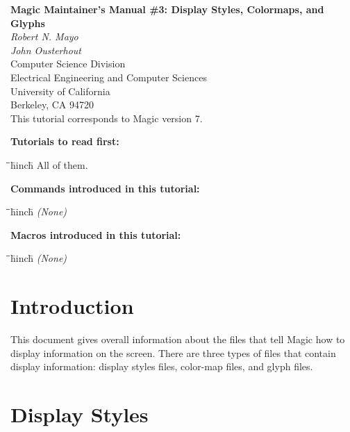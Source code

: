 \documentclass[letterpaper,twoside,12pt]{article}
\def\hinch{\hspace*{0.5in}}
\def\starti{\begin{center}\begin{tabbing}\hinch\=\hinch\=\hinch\=hinch\hinch\=\kill}
\def\endi{\end{tabbing}\end{center}}
\def\mytitle{Magic Maintainer's Manual \#3: Display Styles, Colormaps, and Glyphs}
\begin{document}
\makeatletter
\newcommand{\ps@magic}{%
	\renewcommand{\@oddhead}{\mytitle\hfil\today}%
	\renewcommand{\@evenhead}{\today\hfil\mytitle}%
	\renewcommand{\@evenfoot}{\hfil\textrm{--{\thepage}--}\hfil}%
	\renewcommand{\@oddfoot}{\@evenfoot}}
\newcommand{\ps@mplain}{%
	\renewcommand{\@oddhead}{}%
	\renewcommand{\@evenhead}{}%
	\renewcommand{\@evenfoot}{\hfil\textrm{--{\thepage}--}\hfil}%
	\renewcommand{\@oddfoot}{\@evenfoot}}
\makeatother
\pagestyle{magic}
\thispagestyle{mplain}


\begin{center}
  {\bfseries \Large \mytitle} \\
  \vspace*{0.5in}
  {\itshape Robert N. Mayo} \\
  {\itshape John Ousterhout} \\
  \vspace*{0.5in}
   Computer Science Division \\
   Electrical Engineering and Computer Sciences \\
   University of California \\
   Berkeley, CA  94720 \\
  \vspace*{0.25in}
  This tutorial corresponds to Magic version 7. \\
\end{center}
\vspace*{0.5in}

{\noindent\bfseries\large Tutorials to read first:}
\starti
   \> All of them.
\endi

{\noindent\bfseries\large Commands introduced in this tutorial:}
\starti
   \> {\itshape (None)}
\endi

{\noindent\bfseries\large Macros introduced in this tutorial:}

\starti
   \> {\itshape (None)}
\endi

\vspace*{0.75in}
\section{Introduction}

This document gives overall information about
the files that tell Magic how to display information
on the screen.  There are three types of files that
contain display information:  display styles files,
color-map files, and glyph files.

\section{Display Styles}
\end{document}
